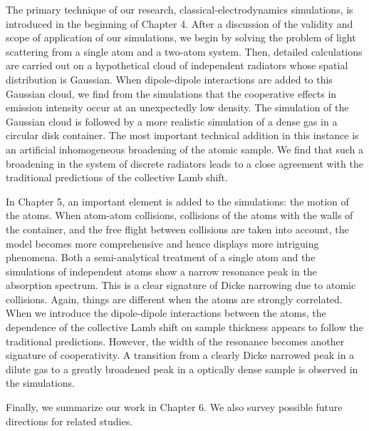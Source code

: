 The primary technique of our research, classical-electrodynamics simulations, is introduced in the beginning of Chapter 4. After a discussion of the validity and scope of application of our simulations, we begin by solving the problem of light scattering from a single atom and a two-atom system. Then, detailed calculations are carried out on a hypothetical cloud of independent radiators whose spatial distribution is Gaussian.  When dipole-dipole interactions are added to this Gaussian cloud, we find from the simulations that the cooperative effects in emission intensity occur at an unexpectedly low density. The simulation of the Gaussian cloud is followed by a more realistic simulation of a dense gas in a circular disk container. The most important technical addition in this instance is an artificial inhomogeneous broadening of the atomic sample. We find that such a broadening in the system of discrete radiators leads to a close agreement with the traditional predictions of the collective Lamb shift.

In Chapter 5, an important element is added to the simulations: the motion of the atoms. When atom-atom collisions, collisions of the atoms with the walls of the container,  and the free flight between collisions are taken into account, the model becomes more comprehensive and hence displays more intriguing phenomena. Both a semi-analytical treatment of a single atom and the simulations of independent atoms show a narrow resonance peak in the absorption spectrum. This is a clear signature of Dicke narrowing due to atomic collisions. Again, things are different when the atoms are strongly correlated. When we introduce the dipole-dipole interactions between the atoms, the dependence of the collective Lamb shift on sample thickness appears to follow the traditional predictions. However, the width of the resonance becomes another signature of cooperativity.  A transition from a clearly Dicke narrowed peak in a dilute gas to a greatly broadened peak in a optically dense sample is observed in the simulations.

Finally, we summarize our work in Chapter 6. We also survey possible future directions for related studies.